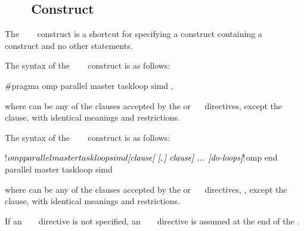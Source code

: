 \subsection{~~~ Construct}
\label{subsec:parallel master taskloop simd Construct}

\summary
The ~~~ construct is a 
shortcut for specifying a  construct containing a
~~ construct and no other statements.

\syntax
\begin{ccppspecific}
The syntax of the ~~~ 
construct is as follows:

\begin{ompcPragma}
#pragma omp parallel master taskloop simd \plc{[clause[ [},\plc{] clause] ... ] new-line}
\end{ompcPragma}

where  can be any of the clauses accepted by the  
or ~~ directives, except the 
 clause, with identical meanings and restrictions.
\end{ccppspecific}

\begin{fortranspecific}
The syntax of the ~~~ 
construct is as follows:

\begin{ompfPragma}
!$omp parallel master taskloop simd \plc{[clause[ [},\plc{] clause] ... ]}
    \plc{do-loops}
\plc{[}!$omp end parallel master taskloop simd\plc{]}
\end{ompfPragma}

where  can be any of the clauses accepted by the  or
~~ directives, , except the 
 clause, with identical meanings and restrictions.

If an ~  ~ 
directive is not specified, an ~ 
~ directive is assumed at the end of the .
\end{fortranspecific}

